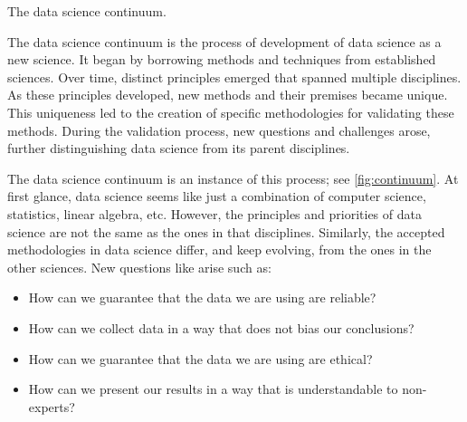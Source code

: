 \begin{figurebox}[label=fig:continuum]{The data science continuum.}
  \centering
  \tcblower
    The data science continuum is the process of development of data science as a new
    science.  It began by borrowing methods and techniques from established sciences. Over
    time, distinct principles emerged that spanned multiple disciplines. As these
    principles developed, new methods and their premises became unique. This uniqueness
    led to the creation of specific methodologies for validating these methods. During the
    validation process, new questions and challenges arose, further distinguishing data
    science from its parent disciplines.
\end{figurebox}

The data science continuum is an instance of this process; see \cref{fig:continuum}.  At
first glance, data science seems like just a combination of computer science, statistics,
linear algebra, etc. However, the principles and priorities of data science are not the
same as the ones in that disciplines.  Similarly, the accepted methodologies in data
science differ, and keep evolving, from the ones in the other sciences.  New questions
like arise such as:
\begin{itemize}
  \itemsep0em
  \item How can we guarantee that the data we are using are reliable?
  \item How can we collect data in a way that does not bias our conclusions?
  \item How can we guarantee that the data we are using are ethical?
  \item How can we present our results in a way that is understandable to non-experts?
\end{itemize}

